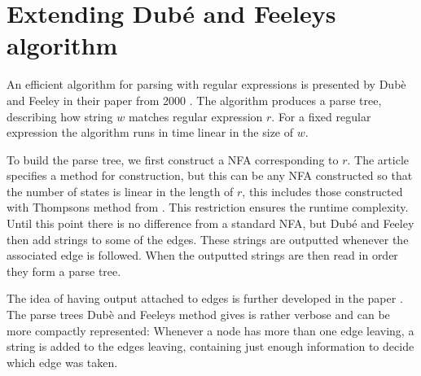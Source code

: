\section{Extending Dub\'{e} and Feeleys algorithm}

An efficient algorithm for parsing with regular expressions is
presented by Dubè and Feeley in their paper from 2000
\cite{Dube2000}. The algorithm produces a parse tree, describing how
string $w$ matches regular expression $r$. For a fixed regular
expression the algorithm runs in time linear in the size of $w$. 

To build the parse tree, we first construct a NFA corresponding to
$r$. The article specifies a method for construction, but this can be
any NFA constructed so that the number of states is linear in the
length of $r$, this includes those constructed with Thompsons method
from \cite{Thompson1968}. This restriction ensures the runtime
complexity. Until this point there is no difference from a standard
NFA, but Dubé and Feeley then add strings to some of the edges. These
strings are outputted whenever the associated edge is followed. When
the outputted strings are then read in order they form a parse tree.











The idea of having output attached to edges is further developed in
the paper \cite{Henglein2010}. The parse trees Dubè and Feeleys method
gives is rather verbose and can be more compactly represented:
Whenever a node has more than one edge leaving, a string is added to
the edges leaving, containing just enough information to decide which
edge was taken.

